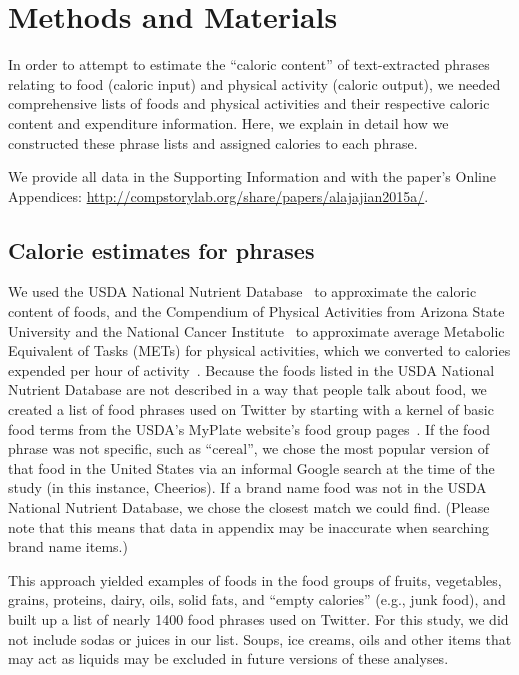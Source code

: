 \section*{Methods and Materials}
\label{sec:fluxwell.methods}

In order to attempt to estimate the ``caloric content''
of text-extracted phrases~\cite{williams2014a} relating to food
(caloric input) and physical activity (caloric output), we needed
comprehensive lists of foods and physical activities and their
respective caloric content and expenditure information.
Here, we explain in detail how we constructed these phrase lists 
and assigned calories to each phrase.

We provide all data in the Supporting Information
and with the paper's Online Appendices:
\url{http://compstorylab.org/share/papers/alajajian2015a/}.

\subsection*{Calorie estimates for phrases}
\label{subsec:fluxwell.methods-phrases-to-calories}

We used the USDA National Nutrient Database~\cite{usda} to approximate
the caloric content of foods, and the Compendium of Physical Activities
from Arizona State University and the National Cancer
Institute~\cite{compendium} to approximate average Metabolic
Equivalent of Tasks (METs) for physical activities, which we converted
to calories expended per hour of activity~\cite{compendium}.
Because the foods listed in the USDA National Nutrient Database are
not described in a way that people talk about food, we created a list
of food phrases used on Twitter by starting with a kernel of basic
food terms from the USDA's MyPlate website's food group
pages~\cite{myplate}.
If the food phrase was not specific, such as ``cereal'', we chose the
most popular version of that food in the United States via an informal
Google search at the time of the study (in this instance, Cheerios).
If a brand name food was not in the USDA National Nutrient Database,
we chose the closest match we could find.  
(Please note that this means that data in appendix may be inaccurate
when searching brand name items.)

This approach yielded examples of foods in the food groups of fruits,
vegetables, grains, proteins, dairy, oils, solid fats, and 
``empty calories'' (e.g., junk food), 
and built up a list of nearly 1400 food phrases used on Twitter.
For this study, we did not include sodas or juices in our list.
Soups, ice creams, oils and other items that may act as liquids may be
excluded in future versions of these analyses.

